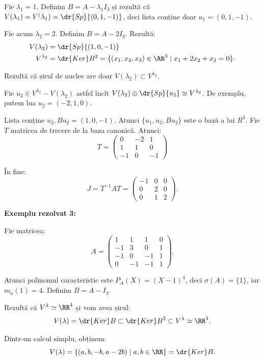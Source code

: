 Fie $ \lambda_1 = 1 $. Definim $ B = A - \lambda_1 I_3 $ și rezultă că
$ V(\lambda_1) = V^(\lambda_1) = \dr{Sp} \{ (0, 1, -1) \} $, deci lista
conține doar $ u_1 = (0, 1, -1) $.

Fie acum $ \lambda_2 = 2 $. Definim $ B = A - 2I_3 $. Rezultă:
\begin{align*}
  V(\lambda_2) &= \dr{Sp}\{(1, 0, -1) \} \\
  V^{\lambda_2} &= \dr{Ker}B^2 = \{ (x_1, x_2, x_3) \in \RR^3 \mid x_1 + 2x_2 + x_3 = 0 \}.
\end{align*}

Rezultă că șirul de nuclee are doar $ V(\lambda_2) \subset V^{\lambda_2} $.

Fie $ u_2 \in V^{\lambda_2} - V(\lambda_2) $ astfel încît
$ V(\lambda_2) \oplus \dr{Sp} \{ u_2 \} \simeq V^{\lambda_2} $. De exemplu,
putem lua $ u_2 = (-2, 1, 0) $.

Lista conține $ u_2, Bu_2 = (1, 0, -1) $. Atunci $ \{ u_1, u_2, Bu_2 \} $
este o bază a lui $ R^3 $. Fie $ T $ matricea de trecere de la baza canonică.
Atunci:
\[
  T = \begin{pmatrix} 0 & -2 & 1 \\ 1 & 1 & 0 \\ -1 & 0 & -1 \end{pmatrix}
\]

În fine:
\[
  J = T^{-1} AT = \begin{pmatrix} -1 & 0 & 0 \\ 0 & 2 & 0 \\ 0 & 1 & 2 \end{pmatrix}.
\]

\vspace{1cm}

\textbf{Exemplu rezolvat 3:}

Fie matricea:
\[
  A =
  \begin{pmatrix}
    1 & 1 & 1 & 0 \\
    -1 & 3 & 0 & 1 \\
    -1 & 0 & -1 & 1 \\
    0 & -1 & -1 & 1
  \end{pmatrix}.
\]

Atunci polinomul caracteristic este $ P_A(X) = (X - 1)^4 $, deci $ \sigma(A) = \{ 1 \} $,
iar $ m_a(1) = 4 $. Definim $ B = A - I_3 $.

Rezultă că $ V^\lambda \simeq \RR^4 $ și vom avea șirul:
\[
  V(\lambda) = \dr{Ker}B \subset \dr{Ker}B^2 \subset V^\lambda \simeq \RR^4.
\]

Dintr-un calcul simplu, obținem:
\[
  V(\lambda) = \{ (a, b, -b, a - 2b) \mid a, b \in \RR \} = \dr{Ker}B.
\]

